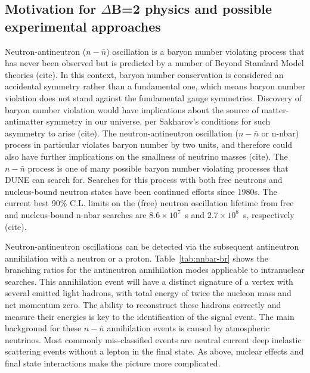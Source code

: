 \subsection{Motivation for $\Delta$B=2 physics and possible experimental approaches}
\label{subsec:nonaccel-nnbar-intro}

Neutron-antineutron ($n - \bar{n}$) oscillation is a baryon number violating process that
has never been observed but is predicted by a number of Beyond Standard Model
theories (cite). In this context, baryon number conservation is considered an accidental
symmetry rather than a fundamental one, which means baryon number violation
does not stand against the fundamental gauge symmetries. Discovery of baryon
number violation would have implications about the source of matter-antimatter
symmetry in our universe, per Sakharov’s conditions for such asymmetry to arise (cite).
The neutron-antineutron oscillation ($n − \bar{n}$ or n-nbar) process in particular violates
baryon number by two units, and therefore could also have further implications on
the smallness of neutrino masses (cite). The $n - \bar{n}$ process is one of many possible baryon number violating processes that DUNE can search for. Searches for this process with
both free neutrons and nucleus-bound neutron states have been continued efforts
since 1980s. The current best 90\% C.L. limits on the (free) neutron oscillation
lifetime from free and nucleus-bound n-nbar searches are $8.6\times10^7$~s and $2.7\times 10^8$~s, respectively (cite).

Neutron-antineutron oscillations can be detected via the subsequent antineutron annihilation with a neutron or a proton. Table~\ref{tab:nnbar-br} shows the branching ratios for the antineutron annihilation modes applicable to intranuclear searches.  This annihilation event will have a distinct signature of a vertex with several emitted light hadrons, with total energy of twice the nucleon mass and net momentum zero. The ability to reconstruct these hadrons correctly and measure their energies is key to the identification of the signal event. The main background for these $n - \bar{n}$ annihilation events is caused by atmospheric neutrinos. Most commonly mis-classified events are neutral current deep inelastic scattering events without a lepton in the final state. As above, nuclear effects and final state interactions make the picture more complicated.

